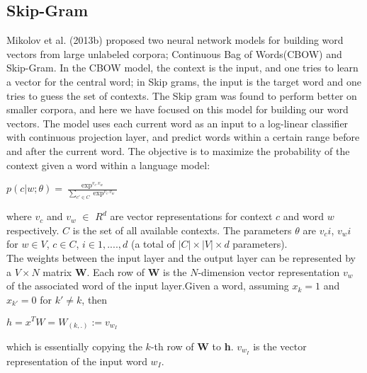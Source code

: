 \subsection{Skip-Gram}
\label{sec:skipgram}
Mikolov et al. (2013b) proposed two neural network models for building word vectors from large unlabeled corpora; Continuous Bag of Words(CBOW) and Skip-Gram.  In the CBOW model, the context is the input, and one tries to learn a vector for the central word; in Skip grams, the input is the target word and one tries to guess the set of contexts.  The Skip gram was found to perform better on smaller corpora, and here we have focused on this model for building our word vectors. The model uses each current word as an input to a log-linear classifier with continuous projection layer, and predict words within a certain range before and after the current word. The objective is to maximize the probability of the context given a word within a language model:

\begin{center} $p(c|w;\theta)=\frac{\exp^{v_c.v_w}}{\sum_{c' \in C}\exp^{v_c.v_w}}$ \end{center}
where $v_c$ and $v_w$ $\in$ $R^d$ are vector representations for context $c$ and word $w$ respectively. $C$ is the set of all available contexts. The parameters $\theta$ are $v_ci$, $v_wi$ for $w \in V$, $c \in C$, $i \in 1,....,d$ (a total of $|C| \times |V| \times d$ parameters).\\

The weights between the input layer and the output layer can be represented by a $V \times N$ matrix \textbf{W}. Each row of \textbf{W} is the $N$-dimension vector representation $v_w$ of the associated word of the input layer.Given a word, assuming $x_k=1$ and $x_{k'}=0$ for $k' \neq k$, then
\begin{center}
$h=x^TW=W_{(k,.)}:=v_{w_I}$
\end{center}
which is essentially copying the $k$-th row of \textbf{W} to \textbf{h}. $v_{w_I}$ is the vector representation of the input word $w_I$.

